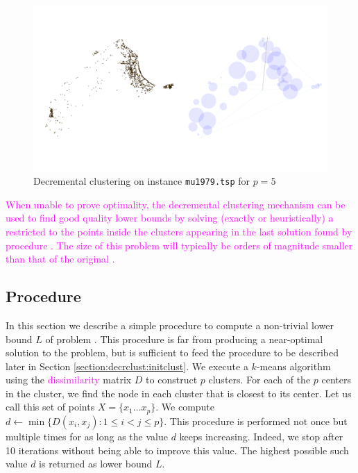 \documentclass[ijoo,nonblindrev]{informs-ijoo}
\begin{document}
\begin{figure}[!hbtp]
	\centering
	\includegraphics[width=16cm]{mu1979.pdf}
	\caption{Decremental clustering on instance \texttt{mu1979.tsp}\label{fig:mu1979} for $p = 5$}
\end{figure}

\begin{remark}
\textcolor{magenta}{When unable to prove optimality, the decremental clustering mechanism can be used to find good quality lower bounds by solving (exactly or heuristically) a \pDP{} restricted to the points inside the clusters appearing in the last solution found by procedure . The size of this problem will typically be orders of magnitude smaller than that of the original \pDP{}.}%
\end{remark}

\subsection{Procedure \label{section:decrclust:hpdp}}

In this section we describe a simple procedure to compute a non-trivial lower bound $L$ of problem . This procedure is far from producing a near-optimal solution to the problem, but is sufficient to feed the procedure  to be described later in Section \ref{section:decrclust:initclust}. We execute a $k$-means algorithm using the \textcolor{magenta}{dissimilarity} matrix $D$ to construct $p$ clusters. For each of the $p$ centers in the cluster, we find the node in each cluster that is closest to its center. Let us call this set of points $X = \{x_1\ldots x_p\}$. We compute $d\leftarrow \min\{D(x_i, x_j): 1\leq i < j \leq p\}$. This procedure is performed not once but multiple times for as long as the value $d$ keeps increasing. Indeed, we stop after 10 iterations without being able to improve this value. The highest possible such value $d$ is returned as lower bound $L$.
\end{document}
